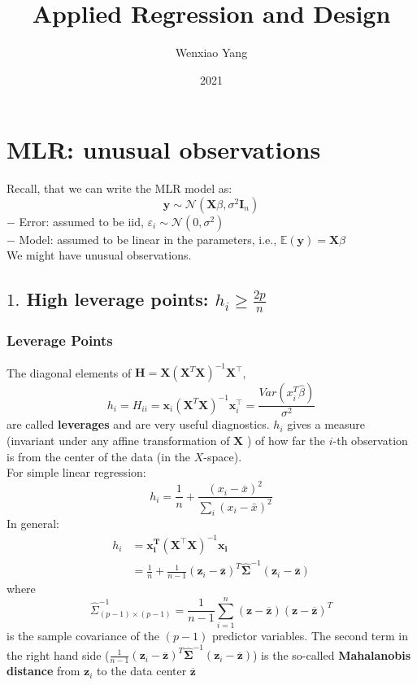 \documentclass[11pt,a4paper]{article}
\title{Applied Regression and Design}
\author[*]{Wenxiao Yang}
\affil[*]{Department of Mathematics, University of Illinois at Urbana-Champaign}
\date{2021}
\begin{document}
\maketitle
\tableofcontents
\newpage




\section{MLR: unusual observations}
Recall, that we can write the MLR model as:
$$
\mathbf{y} \sim \mathcal{N}\left(\mathbf{X} \beta, \sigma^{2} \mathbf{I}_{n}\right)
$$
$-$ Error: assumed to be iid, $\varepsilon_{i} \sim \mathcal{N}\left(0, \sigma^{2}\right)$\\
$-$ Model: assumed to be linear in the parameters, i.e., $\mathbb{E}(\mathbf{y})=\mathbf{X} \beta$\\
We might have unusual observations.




\subsection{$1.$ High leverage points: $h_i\geq \frac{2p}{n}$}
\subsubsection{Leverage Points}
The diagonal elements of $\mathbf{H}=\mathbf{X}\left(\mathbf{X}^{T} \mathbf{X}\right)^{-1} \mathbf{X}^{\top}$,
$$
h_{i}=H_{i i}=\mathbf{x}_i\left(\mathbf{X}^{T} \mathbf{X}\right)^{-1} \mathbf{x}_i^{\top}=\frac{Var(x_i^T \hat{\beta})}{\sigma^2}
$$
are called \textbf{leverages} and are very useful diagnostics.
$h_{i}$ gives a measure (invariant under any affine transformation of $\mathbf{X}$ ) of how far the $i$-th observation is from the center of the data (in the $X$-space).\\
For simple linear regression:
$$
h_{i}=\frac{1}{n}+\frac{\left(x_{i}-\bar{x}\right)^{2}}{\sum_{i}\left(x_{i}-\bar{x}\right)^{2}}
$$
In general:
$$
\begin{aligned}
h_{i} &=\mathbf{x}_{\mathbf{i}}^{\boldsymbol{T}}\left(\mathbf{X}^{\top} \mathbf{X}\right)^{-1} \mathbf{x}_{\mathbf{i}} \\
&=\frac{1}{n}+\frac{1}{n-1}\left(\mathbf{z}_{i}-\overline{\mathbf{z}}\right)^{T} \hat{\boldsymbol{\Sigma}}^{-1}\left(\mathbf{z}_{i}-\overline{\mathbf{z}}\right)
\end{aligned}
$$
where
$$
\hat{\Sigma}_{(p-1) \times(p-1)}^{-1}=\frac{1}{n-1} \sum_{i=1}^{n}(\mathbf{z}-\overline{\mathbf{z}})(\mathbf{z}-\overline{\mathbf{z}})^{T}
$$
is the sample covariance of the $(p-1)$ predictor variables. The second term in the right hand side ($\frac{1}{n-1}\left(\mathbf{z}_{i}-\overline{\mathbf{z}}\right)^{T} \hat{\boldsymbol{\Sigma}}^{-1}\left(\mathbf{z}_{i}-\overline{\mathbf{z}}\right)$) is the so-called \textbf{Mahalanobis distance} from $\mathbf{z}_{i}$ to the data center $\overline{\mathbf{z}}$
\end{document}
